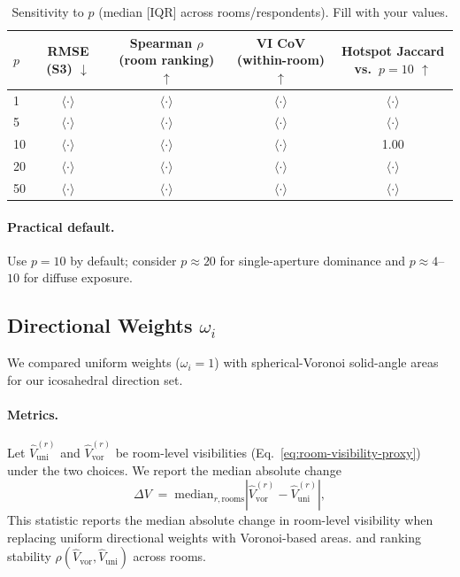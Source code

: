 \documentclass[final,3p,times,review]{elsarticle}
\begin{document}
\begin{table}[H]
\centering
\caption{Sensitivity to $p$ (median [IQR] across rooms/respondents). Fill with your values.}
\label{tab:p-sweep}
\begin{tabular}{@{}lcccc@{}}
\toprule
$p$ & RMSE (S3) $\downarrow$ & Spearman $\rho$ (room ranking) $\uparrow$ & VI CoV (within-room) $\uparrow$ & Hotspot Jaccard vs.\ $p{=}10$ $\uparrow$ \\
\midrule
1  & $\langle\cdot\rangle$ & $\langle\cdot\rangle$ & $\langle\cdot\rangle$ & $\langle\cdot\rangle$ \\
5  & $\langle\cdot\rangle$ & $\langle\cdot\rangle$ & $\langle\cdot\rangle$ & $\langle\cdot\rangle$ \\
10 & $\langle\cdot\rangle$ & $\langle\cdot\rangle$ & $\langle\cdot\rangle$ & 1.00 \\
20 & $\langle\cdot\rangle$ & $\langle\cdot\rangle$ & $\langle\cdot\rangle$ & $\langle\cdot\rangle$ \\
50 & $\langle\cdot\rangle$ & $\langle\cdot\rangle$ & $\langle\cdot\rangle$ & $\langle\cdot\rangle$ \\
\bottomrule
\end{tabular}
\end{table}

\paragraph{Practical default.}
Use $p{=}10$ by default; consider $p{\approx}20$ for single-aperture dominance and $p{\approx}4$--$10$ for diffuse exposure.

\subsection{Directional Weights $\omega_i$}
We compared uniform weights ($\omega_i{=}1$) with spherical-Voronoi solid-angle areas for our icosahedral direction set.

\paragraph{Metrics.}
Let $\widehat{V}^{(r)}_{\text{uni}}$ and $\widehat{V}^{(r)}_{\text{vor}}$ be room-level visibilities (Eq.~\eqref{eq:room-visibility-proxy}) under the two choices. We report the median absolute change
\begin{equation}
\Delta V \;=\; \mathrm{median}_{r,\text{rooms}} \left| \widehat{V}^{(r)}_{\text{vor}} - \widehat{V}^{(r)}_{\text{uni}} \right|,
\label{eq:deltaV}
\end{equation}
This statistic reports the median absolute change in room-level visibility when replacing uniform directional weights with Voronoi-based areas.
and ranking stability $\rho(\widehat{V}_{\text{vor}},\widehat{V}_{\text{uni}})$ across rooms.
\end{document}
